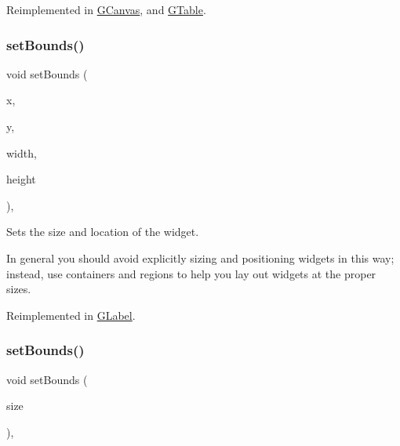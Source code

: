 Reimplemented in \mbox{\hyperlink{classGCanvas_a222fcfb542aa6094c7e0de671bd69627}{G\+Canvas}}, and \mbox{\hyperlink{classGTable_a222fcfb542aa6094c7e0de671bd69627}{G\+Table}}.

\mbox{\label{classGInteractor_a2aae8197624b72265ab83b4f1bc73f2f}} 
\subsubsection{\texorpdfstring{set\+Bounds()}{setBounds()}\hspace{0.1cm}{\footnotesize\ttfamily [1/2]}}
{\footnotesize\ttfamily void set\+Bounds (\begin{DoxyParamCaption}\item[{double}]{x,  }\item[{double}]{y,  }\item[{double}]{width,  }\item[{double}]{height }\end{DoxyParamCaption})\hspace{0.3cm}{\ttfamily [virtual]}, {\ttfamily [inherited]}}



Sets the size and location of the widget. 

In general you should avoid explicitly sizing and positioning widgets in this way; instead, use containers and regions to help you lay out widgets at the proper sizes. 

Reimplemented in \mbox{\hyperlink{classGLabel_aab3121dc97f8c5c1ddee39ea81d08509}{G\+Label}}.

\mbox{\label{classGInteractor_acada386653f008cacc7cce86426bef7c}} 
\subsubsection{\texorpdfstring{set\+Bounds()}{setBounds()}\hspace{0.1cm}{\footnotesize\ttfamily [2/2]}}
{\footnotesize\ttfamily void set\+Bounds (\begin{DoxyParamCaption}\item[{const \mbox{\hyperlink{classGRectangle}{G\+Rectangle}} \&}]{size }\end{DoxyParamCaption})\hspace{0.3cm}{\ttfamily [virtual]}, {\ttfamily [inherited]}}



